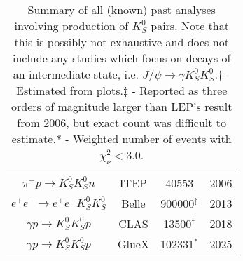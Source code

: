 \begin{table}
\begin{center}
\begin{tabular}{cccc}
      $\pi^- p \to K_S^0 K_S^0 n$ & ITEP & 40553 & 2006\\
      $e^+e^- \to e^+e^- K_S^0 K_S^0$ & Belle & 900000${}^\ddagger$ & 2013\\
      $\gamma p \to K_S^0 K_S^0 p$ & CLAS & 13500${}^\dagger$ & 2018\\
      $\gamma p \to K_S^0 K_S^0 p$ & GlueX & 102331${}^\ast$ & 2025\\
    \end{tabular}
    \caption{Summary of all (known) past analyses involving production of $K_S^0$ pairs. Note that this is possibly not exhaustive and does not include any studies which focus on decays of an intermediate state, i.e. $J/\psi \to \gamma K_S^0K_S^0$.\newline$\dagger$ - Estimated from plots.\newline$\ddagger$ - Reported as three orders of magnitude larger than LEP's result from 2006, but exact count was difficult to estimate.\newline$\ast$ - Weighted number of events with $\chi^2_\nu < 3.0$.}
  \end{center}
\end{table}
